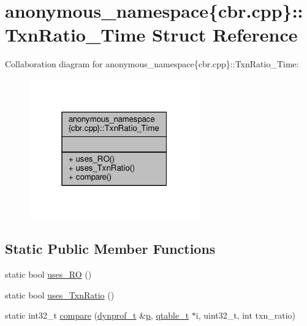 \hypertarget{structanonymous__namespace_02cbr_8cpp_03_1_1TxnRatio__Time}{\section{anonymous\-\_\-namespace\{cbr.\-cpp\}\-:\-:Txn\-Ratio\-\_\-\-Time Struct Reference}
\label{structanonymous__namespace_02cbr_8cpp_03_1_1TxnRatio__Time}
}


Collaboration diagram for anonymous\-\_\-namespace\{cbr.\-cpp\}\-:\-:Txn\-Ratio\-\_\-\-Time\-:
\nopagebreak
\begin{figure}[H]
\begin{center}
\leavevmode
\includegraphics[width=208pt]{structanonymous__namespace_02cbr_8cpp_03_1_1TxnRatio__Time__coll__graph}
\end{center}
\end{figure}
\subsection*{Static Public Member Functions}
\begin{DoxyCompactItemize}
\item 
static bool \hyperlink{structanonymous__namespace_02cbr_8cpp_03_1_1TxnRatio__Time_ae41b806f56ee7cf29ef99326b337139b}{uses\-\_\-\-R\-O} ()
\item 
static bool \hyperlink{structanonymous__namespace_02cbr_8cpp_03_1_1TxnRatio__Time_a630abafddaf646f276c16ad1b081fa45}{uses\-\_\-\-Txn\-Ratio} ()
\item 
static int32\-\_\-t \hyperlink{structanonymous__namespace_02cbr_8cpp_03_1_1TxnRatio__Time_afa9532e9bb1e4973feb4fcac9d586367}{compare} (\hyperlink{structstm_1_1dynprof__t}{dynprof\-\_\-t} \&\hyperlink{counted__ptr_8hpp_a5c9f59d7c24e3fd6ceae319a968fc3e0}{p}, \hyperlink{structstm_1_1qtable__t}{qtable\-\_\-t} $\ast$i, uint32\-\_\-t, int txn\-\_\-ratio)
\end{DoxyCompactItemize}


